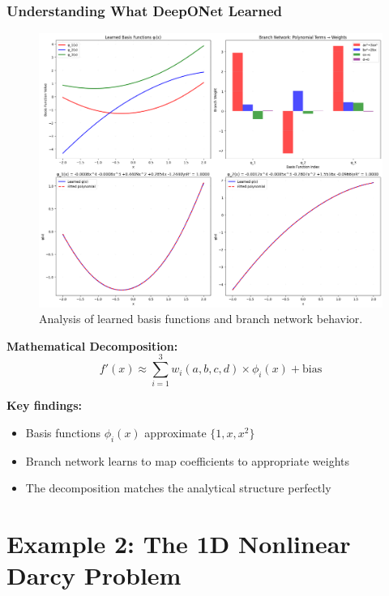 \documentclass[notes]{beamer}
\begin{document}
\begin{frame}
\frametitle{Understanding What DeepONet Learned}

\begin{figure}[ht]
	\centering
	\includegraphics[width=\textwidth]{figs/basis_analysis.png}
	\caption*{Analysis of learned basis functions and branch network behavior.}
\end{figure}

\textbf{Mathematical Decomposition:}
\begin{equation*}
f'(x) \approx \sum_{i=1}^3 w_i(a,b,c,d) \times \phi_i(x) + \text{bias}
\end{equation*}

\textbf{Key findings:}
\begin{itemize}
    \item Basis functions $\phi_i(x)$ approximate $\{1, x, x^2\}$
    \item Branch network learns to map coefficients to appropriate weights
    \item The decomposition matches the analytical structure perfectly
\end{itemize}

\end{frame}

\section{Example 2: The 1D Nonlinear Darcy Problem}
\end{document}
